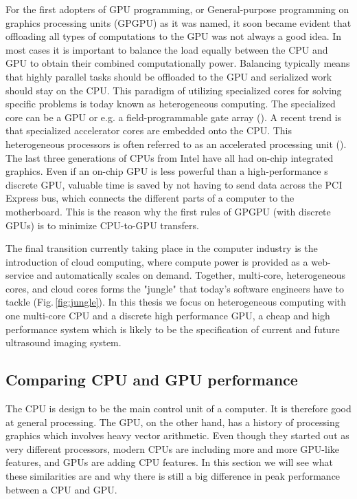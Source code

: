 For the first adopters of GPU programming, or General-purpose programming on graphics processing units (GPGPU) as it was named, it soon became evident that offloading all types of computations to the GPU was not always a good idea. In most cases it is important to balance the load equally between the CPU and GPU to obtain their combined computationally power. Balancing typically means that highly parallel tasks should be offloaded to the GPU and serialized work should stay on the CPU. This paradigm of utilizing specialized cores for solving specific problems is today known as heterogeneous computing. The specialized core can be a GPU or e.g. a field-programmable gate array (). A recent trend is that specialized accelerator cores are embedded onto the CPU. This heterogeneous processors is often referred to as an accelerated processing unit (). The last three generations of CPUs from Intel have all had on-chip integrated graphics. Even if an on-chip GPU is less powerful than a high-performance s discrete GPU, valuable time is saved by not having to send data across the PCI Express bus, which connects the different parts of a computer to the motherboard. This is the reason why the first rules of GPGPU (with discrete GPUs) is to minimize CPU-to-GPU transfers. 

The final transition currently taking place in the computer industry is the introduction of cloud computing, where compute power is provided as a web-service and automatically scales on demand. Together, multi-core, heterogeneous cores, and cloud cores forms the "jungle" that today's software engineers have to tackle (Fig.\,\ref{fig:jungle}). In this thesis we focus on heterogeneous computing with one multi-core CPU and a discrete high performance GPU, a cheap and high performance system which is likely to be the specification of current and future ultrasound imaging system.

\subsection{Comparing CPU and GPU performance}\label{sec:cpu_vs_gpu}
The CPU is design to be the main control unit of a computer. It is therefore good at general processing. The GPU, on the other hand, has a history of processing graphics which involves heavy vector arithmetic. Even though they started out as very different processors, modern CPUs are including more and more GPU-like features, and GPUs are adding CPU features. In this section we will see what these similarities are and why there is still a big difference in peak performance between a CPU and GPU.


